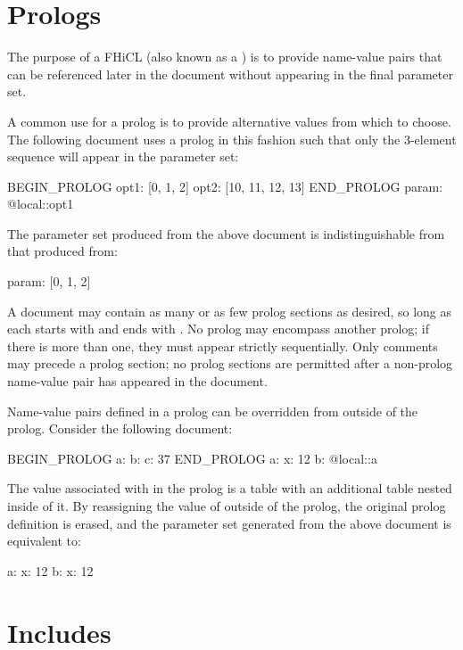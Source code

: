 \documentclass[draftmode,draftwater]{memarticle}
\newcommand{\fhicl}{FHiCL\xspace}
\begin{document}
\chapter{Prologs}
\label{sec:prologs}

The purpose of a \fhicl {} (also known as a ) is to provide name-value pairs that can be referenced
later in the document without appearing in the final parameter set.

A common use for a prolog is to provide alternative values from which
to choose.  The following document uses a prolog in this fashion such
that only the 3-element sequence will appear in the parameter set:
%
\Needspace{0.84in}
\begin{fcllisting}[texcl,escapechar=`]
BEGIN_PROLOG
  opt1: [0, 1, 2]
  opt2: [10, 11, 12, 13]
END_PROLOG
param: @local::opt1
\end{fcllisting}
%
The parameter set produced from the above document is
indistinguishable from that produced from:
%
\Needspace{0.17in}
\begin{fcllisting}[texcl,escapechar=`]
param: [0, 1, 2]
\end{fcllisting}

A document may contain as many or as few prolog sections as desired,
so long as each starts with  and ends with
.  No prolog may encompass another prolog; if
there is more than one, they must appear strictly sequentially.  Only
comments may precede a prolog section; no prolog sections are
permitted after a non-prolog name-value pair has appeared in the
document.

Name-value pairs defined in a prolog can be overridden from outside of
the prolog.  Consider the following document:
\Needspace{0.34in}
\begin{fcllisting}[texcl,escapechar=`]
BEGIN_PROLOG
a: { b: { c: 37 } }
END_PROLOG
a: { x: 12 }
b: @local::a
\end{fcllisting}
%
The value associated with  in the prolog is a table with an
additional table nested inside of it.  By reassigning the value of
 outside of the prolog, the original prolog definition is
erased, and the parameter set generated from the above document is
equivalent to:
%
\Needspace{0.34in}
\begin{fcllisting}[texcl,escapechar=`]
a: { x: 12 }
b: { x: 12 }
\end{fcllisting}

\chapter{Includes}
\end{document}
